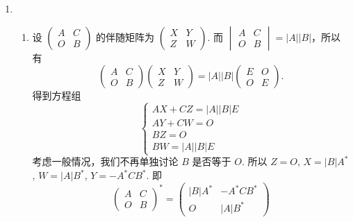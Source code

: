 \begin{enumerate}
    \item \begin{enumerate}
              \item 设 $\begin{pmatrix}
                            A & C \\
                            O & B
                        \end{pmatrix}$ 的伴随矩阵为 $\begin{pmatrix}
                            X & Y \\
                            Z & W
                        \end{pmatrix}$. 而 $\begin{vmatrix}
                            A & C \\
                            O & B
                        \end{vmatrix} = \lvert A\rvert \lvert B \rvert$，所以有
                    \[\begin{pmatrix}
                            A & C \\
                            O & B
                        \end{pmatrix} \begin{pmatrix}
                            X & Y \\
                            Z & W
                        \end{pmatrix} = \lvert A\rvert \lvert B \rvert \begin{pmatrix}
                            E & O \\
                            O & E
                        \end{pmatrix}.\]
                    得到方程组
                    \[\begin{cases}
                            AX+CZ = \lvert A \rvert \lvert B \rvert E \\
                            AY+CW = O                                 \\
                            BZ    = O                                 \\
                            BW    = \lvert A \rvert \lvert B \rvert E
                        \end{cases}\]
                    考虑一般情况，我们不再单独讨论 $B$ 是否等于 $O$. 所以 $Z = O$, $X = \lvert B \rvert A^*$, $W = \lvert A \rvert B^*$, $Y = -A^*CB^*$. 即 \[\begin{pmatrix}
                            A & C \\
                            O & B
                        \end{pmatrix}^* = \begin{pmatrix}
                            \lvert B \rvert A^* & -A^*CB^*            \\
                            O                   & \lvert A \rvert B^*
                        \end{pmatrix}\]


\end{enumerate}
\end{enumerate}
